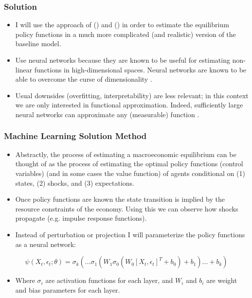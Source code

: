 \documentclass{beamer}
\begin{document}
\begin{frame}
    \frametitle{Solution}
    \vspace{0.5cm}
    \begin{itemize}
        \item I will use the approach of \citeauthor{maliar2021deep} (\citeyear{maliar2021deep}) and \citeauthor{azinovic2019deep} (\citeyear{azinovic2019deep}) in order to estimate the equilibrium policy functions in a much more complicated (and realistic) version of the baseline model.
        \item Use neural networks because they are known to be useful for estimating non-linear functions in high-dimensional spaces. Neural networks are known to be able to overcome the curse of dimensionality \parencite{shen2021neural}.
        \item Usual downsides (overfitting, interpretability) are less relevant; in this context we are only interested in functional approximation. Indeed, sufficiently large neural networks can approximate any (measurable) function \parencite{hornik1989multilayer}.
    \end{itemize}
\end{frame}

\begin{frame}
    \frametitle{Machine Learning Solution Method}
    \begin{itemize}
        \item Abstractly, the process of estimating a macroeconomic equilibrium can be thought of as the process of estimating the optimal policy functions (control variables) (and in some cases the value function) of agents conditional on (1) states, (2) shocks, and (3) expectations. 
        \item Once policy functions are known the state transition is implied by the resource constraints of the economy. Using this we can observe how shocks propagate (e.g. impulse response functions).
        \item Instead of perturbation or projection I will parameterize the policy functions as a neural network:
    \end{itemize}

    \vspace{-0.5cm}

    \begin{equation}
        \psi(X_t, \epsilon_t; \theta) = \sigma_k(... \sigma_1(W_1\sigma_0(W_0\left[X_t, \epsilon_t\right]^T + b_0) + b_1) ... + b_k)
    \end{equation}

    \begin{itemize}
        \item Where $\sigma_i$ are activation functions for each layer, and $W_i$ and $b_i$ are weight and bias parameters for each layer. 
    \end{itemize}
    
\end{frame}
\end{document}
